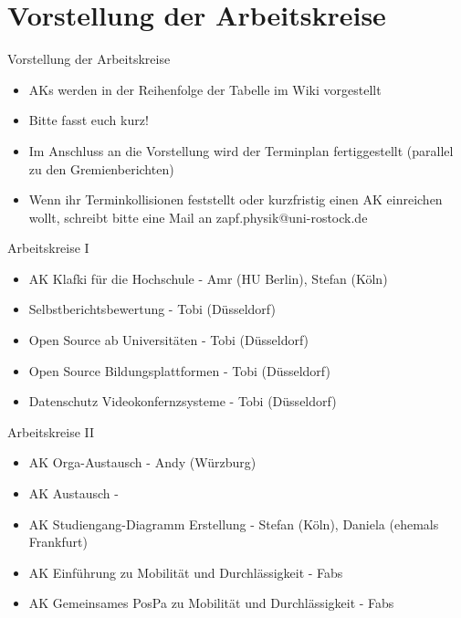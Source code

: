 \documentclass[compress, aspectratio=169]{beamer}
\begin{document}
	\section{Vorstellung der Arbeitskreise}
	
	\begin{frame}{Vorstellung der Arbeitskreise}
		\begin{itemize}
			\item AKs werden in der Reihenfolge der Tabelle im Wiki vorgestellt
			\item Bitte fasst euch kurz!
			\item Im Anschluss an die Vorstellung wird der Terminplan fertiggestellt (parallel zu den Gremienberichten)
			\item Wenn ihr Terminkollisionen feststellt oder kurzfristig einen AK einreichen wollt, schreibt bitte eine Mail an zapf.physik@uni-rostock.de
		\end{itemize}
	\end{frame}
	
	\begin{frame}{Arbeitskreise I}
		\begin{itemize}
			\item AK Klafki für die Hochschule - Amr (HU Berlin), Stefan (Köln)
			\item Selbstberichtsbewertung - Tobi (Düsseldorf)
			\item Open Source ab Universitäten - Tobi (Düsseldorf)
			\item Open Source Bildungsplattformen - Tobi (Düsseldorf)
			\item Datenschutz Videokonfernzsysteme - Tobi (Düsseldorf)
		\end{itemize}
	\end{frame}
	
	\begin{frame}{Arbeitskreise II}
		\begin{itemize}
			\item AK Orga-Austausch - Andy (Würzburg)
			\item AK Austausch - 
			\item AK Studiengang-Diagramm Erstellung - Stefan (Köln), Daniela (ehemals Frankfurt)
			\item AK Einführung zu Mobilität und Durchlässigkeit - Fabs
			\item AK Gemeinsames PosPa zu Mobilität und Durchlässigkeit -  Fabs
		\end{itemize}
	\end{frame}
	
\end{document}
